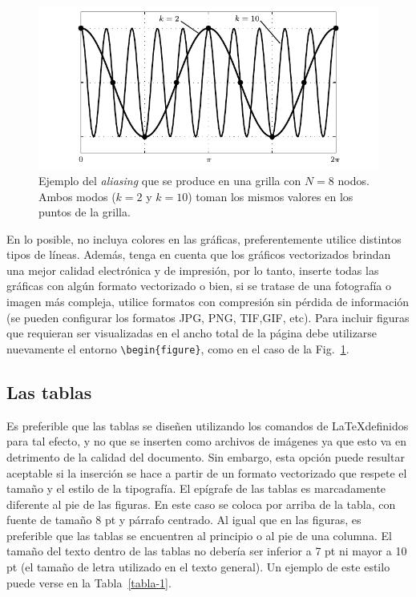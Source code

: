\documentclass[esp]{FCEFyN-class}
\begin{document}
\begin{figure}[!tb] 
 \centering
 \includegraphics{figura2.pdf} 
 \caption{Ejemplo del \emph{aliasing} que se produce en una grilla con $N = 8$ nodos. Ambos modos
          ($k = 2$ y $k = 10$) toman los mismos valores en los puntos de la grilla.} \label{fig-2}
\end{figure}

En lo posible, no incluya colores en las gráficas, preferentemente utilice distintos tipos de líneas.
Además, tenga en cuenta que los gráficos vectorizados brindan una mejor calidad electrónica y de
impresión, por lo tanto, inserte todas las gráficas con algún formato vectorizado o bien, si se
tratase de una fotografía o imagen más compleja, utilice formatos con compresión sin pérdida de
información (se pueden configurar los formatos JPG, PNG, TIF,GIF, etc).
Para incluir figuras que requieran ser visualizadas en el ancho total de la página debe utilizarse
nuevamente el entorno \verb!\begin{figure}!, como en el caso de la Fig.~\ref{fig-2}.


\subsection{Las tablas}
Es preferible que las tablas se diseñen utilizando los comandos de \LaTeX definidos para tal efecto,
y no que se inserten como archivos de imágenes ya que esto va en detrimento de la calidad del
documento. Sin embargo, esta opción puede resultar aceptable si la inserción se hace a partir de un
formato vectorizado que respete el tamaño y el estilo de la tipografía.
El epígrafe de las tablas es marcadamente diferente al pie de las figuras. En este caso se coloca por
arriba de la tabla, con fuente de tamaño 8 pt y párrafo centrado.
Al igual que en las figuras, es preferible que las tablas se encuentren al principio o al pie de una
columna. El tamaño del texto dentro de las tablas no debería ser inferior a 7 pt ni mayor a 10 pt (el
tamaño de letra utilizado en el texto general).
Un ejemplo de este estilo puede verse en la Tabla~\ref{tabla-1}.
\end{document}
